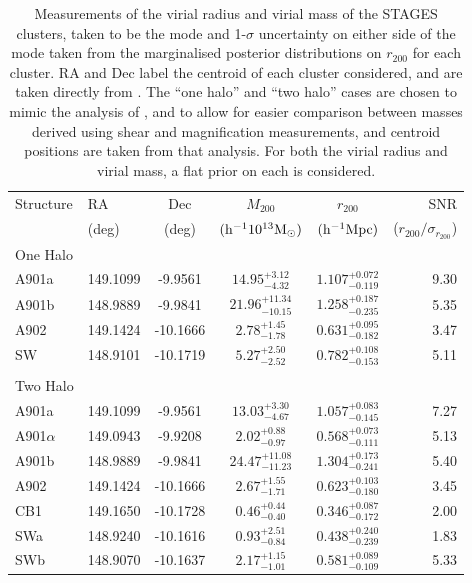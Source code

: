 \documentclass[useAMS,usenatbib,times,letter,amssymb]{mn2e}
\begin{document}
\begin{table}
\begin{center}
\begin{tabular}{l|l|c|c|c|r}
\hline
Structure & RA & Dec & $M_{200}$ & $r_{200}$ & SNR\\
& (deg) & (deg)& $({\rm h}^{-1} 10^{13} {\rm M}_{\odot})$ & $({\rm h}^{-1} {\rm Mpc})$ & ($r_{200}/\sigma_{r_{200}}$)\\
\hline
One Halo\\
A901a & 149.1099 & -9.9561 & $14.95^{+3.12}_{-4.32}$ & $1.107^{+0.072}_{-0.119}$ & 9.30 \\[5pt]
A901b & 148.9889 & -9.9841 &  $21.96^{+11.34}_{-10.15}$  & $1.258^{+0.187}_{-0.235}$ & 5.35 \\[5pt]
A902 & 149.1424 & -10.1666 & $2.78^{+1.45}_{-1.78}$ & $0.631^{+0.095}_{-0.182}$ & 3.47\\[5pt]
SW & 148.9101 & -10.1719 & $5.27^{+2.50}_{-2.52}$  & $0.782^{+0.108}_{-0.153}$ &  5.11\\[5pt]
\\
Two Halo\\
A901a &  149.1099 &  -9.9561 &$13.03_{- 4.67}^{+ 3.30}$ & $1.057_{-0.145}^{+0.083}$ & 7.27 \\[5pt]
A901$\alpha$ & 149.0943 &  -9.9208 & $2.02_{- 0.97}^{+ 0.88}$ & $0.568_{-0.111}^{+0.073}$ & 5.13 \\[5pt]
A901b & 148.9889 & -9.9841 & $24.47_{- 11.23}^{+ 11.08}$  & $1.304_{-0.241}^{+0.173}$ & 5.40 \\[5pt]
A902 & 149.1424 & -10.1666 &$ 2.67_{- 1.71}^{+1.55}$ &$0.623_{-0.180}^{+0.103}$ & 3.45\\[5pt]
CB1 & 149.1650 & -10.1728 & $0.46_{- 0.40}^{+ 0.44}$ &$0.346_{-0.172}^{+0.087}$ &  2.00\\[5pt]
SWa & 148.9240 & -10.1616 & $0.93_{- 0.84}^{+2.51}$ &$0.438_{-0.239}^{+0.240}$ & 1.83\\[5pt]
SWb & 148.9070 & -10.1637 & $2.17_{-1.01}^{+1.15}$ &$0.581_{-0.109}^{+0.089}$ & 5.33\\[5pt]
%
\hline
\end{tabular}
\end{center}
\caption{Measurements of the virial radius and virial mass of the STAGES clusters, taken to be the mode and 1-$\sigma$ uncertainty on either side of the mode taken from the marginalised posterior distributions on $r_{200}$ for each cluster. RA and Dec label the centroid of each cluster considered, and are taken directly from \cite{Heymans:2008p2060}. The ``one halo'' and ``two halo'' cases are chosen to mimic the analysis of \cite{Heymans:2008p2060}, and to allow for easier comparison between masses derived using shear and magnification measurements, and centroid positions are taken from that analysis. For both the virial radius and virial mass, a flat prior on each is considered.}
\label{tab:NFW_res}
\end{table}
\end{document}
